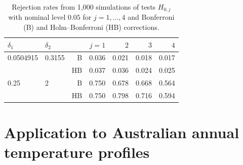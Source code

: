 \documentclass[11pt]{article}
\numberwithin{equation}{section}
\numberwithin{theorem}{section}
\numberwithin{lemma}{section}
\numberwithin{proposition}{section}
\numberwithin{cor}{section}
\numberwithin{definition}{section}
\numberwithin{cons}{section}
\numberwithin{rem}{section}
\numberwithin{exa}{section}
\numberwithin{table}{section}
\numberwithin{figure}{section}
\numberwithin{algo}{section}
\begin{document}
{{\begin{table}[H]
\vspace{.2cm}
\centering
\begin{tabular}{l l r@{\qquad} r r r r}
\hline
 {$\delta_1$} &  {$\delta_2$} & & { $j=1$ } & {$2$} & {$ 3 $} &{ $4$ }  \\ \hline
0.0504915 &  0.3155 & B & 0.036 & 0.021 & 0.018 & 0.017 \\
&& HB & 0.037 & 0.036 & 0.024 & 0.025 \\
0.25    & 2 & B & 0.750 & 0.678 & 0.668 & 0.564 \\
&&  HB & 0.750 & 0.798 &0.716 & 0.594 \\
\hline
\end{tabular}
\caption{Rejection rates from 1{,}000 simulations of tests $H_{0,j}$ with nominal level $0.05$ for $j=1,
\ldots,4$ and Bonferroni (B) and Holm--Bonferroni (HB) corrections.}\label{pow:tab}
\end{table}

\section{Application to Australian annual temperature profiles}
\label{sec4}
\def\theequation{4.\arabic{equation}}
\setcounter{equation}{0}

}}
\end{document}
